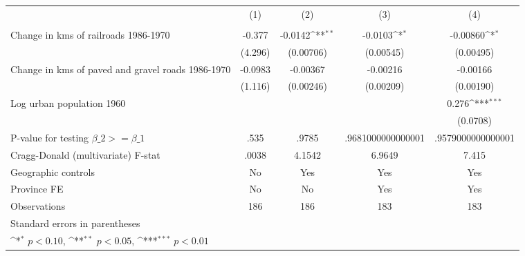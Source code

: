 {
\def\sym#1{\ifmmode^{#1}\else\(^{#1}\)\fi}
\begin{tabular}{l*{4}{c}}
\hline\hline
                &\multicolumn{1}{c}{(1)}&\multicolumn{1}{c}{(2)}&\multicolumn{1}{c}{(3)}&\multicolumn{1}{c}{(4)}\\
                &\multicolumn{1}{c}{}&\multicolumn{1}{c}{}&\multicolumn{1}{c}{}&\multicolumn{1}{c}{}\\
\hline
Change in kms of railroads 1986-1970&   -0.377         &  -0.0142\sym{**} &  -0.0103\sym{*}  & -0.00860\sym{*}  \\
                &  (4.296)         &(0.00706)         &(0.00545)         &(0.00495)         \\
[1em]
Change in kms of paved and gravel roads 1986-1970&  -0.0983         & -0.00367         & -0.00216         & -0.00166         \\
                &  (1.116)         &(0.00246)         &(0.00209)         &(0.00190)         \\
[1em]
Log urban population 1960&                  &                  &                  &    0.276\sym{***}\\
                &                  &                  &                  & (0.0708)         \\
\hline
P-value for testing $\beta\_{2} >= \beta\_{1}$&     .535         &    .9785         &.9681000000000001         &.9579000000000001         \\
Cragg-Donald (multivariate) F-stat&    .0038         &   4.1542         &   6.9649         &    7.415         \\
Geographic controls&       No         &      Yes         &      Yes         &      Yes         \\
Province FE     &       No         &       No         &      Yes         &      Yes         \\
Observations    &      186         &      186         &      183         &      183         \\
\hline\hline
\multicolumn{5}{l}{\footnotesize Standard errors in parentheses}\\
\multicolumn{5}{l}{\footnotesize \sym{*} \(p<0.10\), \sym{**} \(p<0.05\), \sym{***} \(p<0.01\)}\\
\end{tabular}
}
